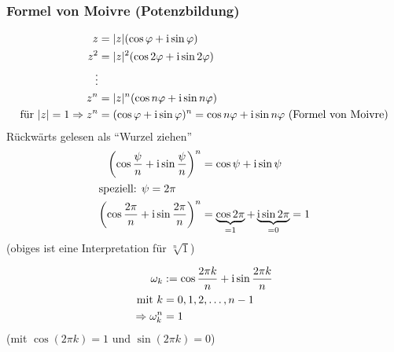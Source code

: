 \subsubsection*{Formel von Moivre (Potenzbildung)}
\begin{align*}
	z &= |z|(\cos \varphi + \operatorname{i} \sin \varphi) \\
	z^2 &= |z|^2(\cos 2\varphi + \operatorname{i} \sin 2\varphi) \\
	\vdots \\
	z^n &= |z|^n(\cos n\varphi + \operatorname{i} \sin n\varphi) \\
	\text{für } |z| = 1 \Rightarrow z^n &= (\cos \varphi + \operatorname{i} \sin \varphi)^n = \cos n\varphi + \operatorname{i} \sin n\varphi \text{ (Formel von Moivre)}
\end{align*}
%
Rückwärts gelesen als "`Wurzel ziehen"'
\begin{align*}
	\left(\cos\frac{\psi}{n} + \operatorname{i} \sin\frac{\psi}{n}\right)^n &= \cos \psi + \operatorname{i} \sin \psi \\
	\intertext{speziell: $\psi = 2\pi$}
	\left(\cos\frac{2\pi}{n} + \operatorname{i} \sin\frac{2\pi}{n}\right)^n &= \underbrace{\cos 2\pi}_{=1} + \underbrace{\operatorname{i} \sin 2\pi}_{=0} = 1 \\
\end{align*}
(obiges ist eine Interpretation für $\sqrt[n]{1}$)

\begin{definition}
	\begin{align*}
		\omega_k &:= \cos\frac{2\pi k}{n} + \operatorname{i} \sin\frac{2\pi k}{n} \\
		\text{mit } k &= 0, 1, 2, \ldots, n - 1 \\
		\Rightarrow \omega_k^n &= 1
	\end{align*}
	(mit $\cos \left(2\pi k\right) = 1 \text{ und } \sin \left(2\pi k\right) = 0$)
\end{definition}

